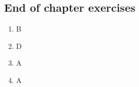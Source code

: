 \subsection{End of chapter exercises}
\begin{multicols}{3}
 \begin{enumerate}[noitemsep, label=\textbf{(\arabic*)} ]
  \item B
\item D
  \item A
\item A
 \end{enumerate}
\end{multicols}

